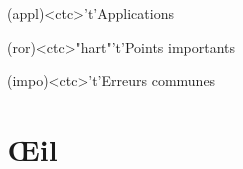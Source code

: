 \documentclass[../../main/main.tex]{subfiles}
\begin{document}
\begin{tcn}[%
		sidebyside, fontupper=\small, fontlower=\small
	]
	\begin{tcn}[nsp](appl)<ctc>'t'{Applications}
	\end{tcn}
	\begin{tcn}[nsp](ror)<ctc>"hart"'t'{Points importants}
	\end{tcn}
	\begin{tcn}[nsp](impo)<ctc>'t'{Erreurs communes}
	\end{tcn}
\end{tcn}

\vspace*{\fill}


\newpage

\section{Œil}
\end{document}
